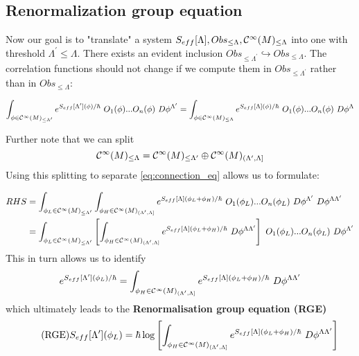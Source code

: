 \subsection{Renormalization group equation}
\label{subsec:renorm_group_eq}

Now our goal is to "translate" a system $S_{eff}[\Lambda], Obs_{\leq \Lambda}, \mathcal{C}^{\infty}(M)_{\leq \Lambda}$ into one with threshold $\Lambda^\prime \leq \Lambda$. There exists an evident inclusion $Obs_{\leq \Lambda^\prime} \hookrightarrow Obs_{\leq \Lambda}$. The correlation functions should not change if we compute them in $Obs_{\leq \Lambda^\prime}$ rather than in $Obs_{\leq \Lambda}$:

\begin{align}
\label{eq:connection_eq}
  \int_{\phi \in \Ci(M)_{\leq \Lambda^\prime}} e^{S_{eff}[\Lambda^\prime] (\phi) / \hbar} \ O_1(\phi) ... O_n(\phi) \ D\phi^{\Lambda^\prime} = \int_{\phi \in \Ci(M)_{\leq \Lambda}} e^{S_{eff}[\Lambda] (\phi) / \hbar} \ O_1(\phi) ... O_n(\phi) \ D\phi^{\Lambda}
\end{align}

Further note that we can split
$$ \mathcal{C}^{\infty}(M)_{\leq \Lambda} = \mathcal{C}^{\infty}(M)_{\leq \Lambda^\prime} \oplus \mathcal{C}^{\infty}(M)_{(\Lambda^\prime,\Lambda]} $$
Using this splitting to separate \eqref{eq:connection_eq} allows us to formulate:

\begin{align*}
  RHS &= \int_{\phi_L \in \Ci(M)_{\leq \Lambda^\prime}}
  \int_{\phi_H \in \Ci(M)_{(\Lambda^\prime,\Lambda]}}
  e^{S_{eff}[\Lambda] (\phi_L + \phi_H) / \hbar} \ O_1(\phi_L) ... O_n(\phi_L) \ D\phi^{\Lambda^\prime} \ D\phi^{\Lambda \Lambda^\prime} \\
  &= \int_{\phi_L \in \Ci(M)_{\leq \Lambda^\prime}}
  \left [\int_{\phi_H \in \Ci(M)_{(\Lambda^\prime,\Lambda]}}
  e^{S_{eff}[\Lambda] (\phi_L + \phi_H) / \hbar} \ D\phi^{\Lambda \Lambda^\prime} \right] \ O_1(\phi_L) ... O_n(\phi_L) \ D\phi^{\Lambda^\prime} \\
\end{align*}
This in turn allows us to identify
$$ e^{S_{eff}[\Lambda^\prime](\phi_L)/\hbar}
= \int_{\phi_H \in \Ci(M)_{(\Lambda^\prime,\Lambda]}}
e^{S_{eff}[\Lambda] (\phi_L + \phi_H) / \hbar} \ D\phi^{\Lambda \Lambda^\prime} $$
which ultimately leads to the \textbf{Renormalisation group equation (RGE)}
\begin{align}
\label{eq:RGE}\tag{RGE}
  S_{eff}[\Lambda^\prime](\phi_L)
  = \hbar \log \left[ \int_{\phi_H \in \Ci(M)_{(\Lambda^\prime,\Lambda]}}
  e^{S_{eff}[\Lambda] (\phi_L + \phi_H) / \hbar} \ D\phi^{\Lambda \Lambda^\prime} \right]
\end{align}

